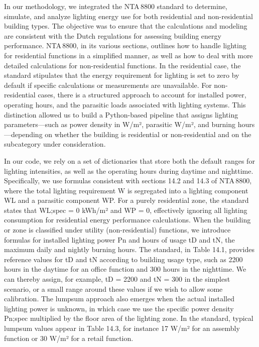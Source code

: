 In our methodology, we integrated the NTA 8800 standard to determine, simulate, and analyze lighting energy use for both residential and non-residential building types. The objective was to ensure that the calculations and modeling are consistent with the Dutch regulations for assessing building energy performance. NTA 8800, in its various sections, outlines how to handle lighting for residential functions in a simplified manner, as well as how to deal with more detailed calculations for non-residential functions. In the residential case, the standard stipulates that the energy requirement for lighting is set to zero by default if specific calculations or measurements are unavailable. For non-residential cases, there is a structured approach to account for installed power, operating hours, and the parasitic loads associated with lighting systems. This distinction allowed us to build a Python-based pipeline that assigns lighting parameters—such as power density in W/m², parasitic W/m², and burning hours—depending on whether the building is residential or non-residential and on the subcategory under consideration.

In our code, we rely on a set of dictionaries that store both the default ranges for lighting intensities, as well as the operating hours during daytime and nighttime. Specifically, we use formulas consistent with sections 14.2 and 14.3 of NTA 8800, where the total lighting requirement W is segregated into a lighting component WL and a parasitic component WP. For a purely residential zone, the standard states that WL;spec = 0 kWh/m² and WP = 0, effectively ignoring all lighting consumption for residential energy performance calculations. When the building or zone is classified under utility (non-residential) functions, we introduce formulas for installed lighting power Pn and hours of usage tD and tN, the maximum daily and nightly burning hours. The standard, in Table 14.1, provides reference values for tD and tN according to building usage type, such as 2200 hours in the daytime for an office function and 300 hours in the nighttime. We can thereby assign, for example, tD = 2200 and tN = 300 in the simplest scenario, or a small range around these values if we wish to allow some calibration. The lumpsum approach also emerges when the actual installed lighting power is unknown, in which case we use the specific power density Pn;spec multiplied by the floor area of the lighting zone. In the standard, typical lumpsum values appear in Table 14.3, for instance 17 W/m² for an assembly function or 30 W/m² for a retail function.

